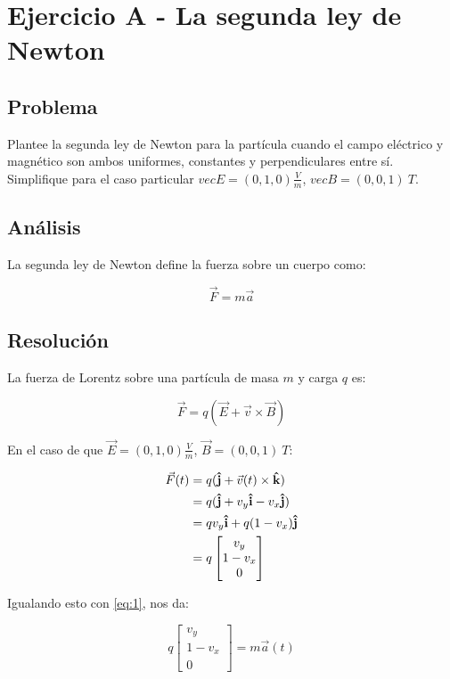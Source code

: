\section{Ejercicio A - La segunda ley de Newton}

\subsection{Problema}

Plantee la segunda ley de Newton para la partícula cuando el campo eléctrico y magnético son ambos uniformes, constantes y perpendiculares entre sí. Simplifique para el caso particular $vec{E} = (0, 1, 0) \frac{V}{m}$, $vec{B} = (0, 0, 1)\ T$.

\subsection{Análisis}

La segunda ley de Newton define la fuerza sobre un cuerpo como:

\begin{equation}\label{eq:1}
	\vec{F} = m \vec{a}
\end{equation}

\subsection{Resolución}

La fuerza de Lorentz sobre una partícula de masa $m$ y carga $q$ es:

\begin{equation}
	\vec{F} = q(\vec{E} + \vec{v} \times \vec{B})
\end{equation}

En el caso de que $\vec{E} = (0, 1, 0) \frac{V}{m}$, $\vec{B} = (0, 0, 1)\ T$:

\begin{align*}
\vec{F}(t)  
& =
	q(\boldsymbol{\hat{\textbf{j}}} + \vec{v}(t) \times \boldsymbol{\hat{\textbf{k}}}) \\
& =
	q(\boldsymbol{\hat{\textbf{j}}} + v_y \boldsymbol{\hat{\textbf{i}}} - v_x \boldsymbol{\hat{\textbf{j}}} ) \\
& = 
	qv_y \boldsymbol{\hat{\textbf{i}}} + q(1-v_x)\boldsymbol{\hat{\textbf{j}}} \\
& =
	q \begin{bmatrix}
		v_y \\
		1 - v_x \\
		0
	\end{bmatrix}
\end{align*}

Igualando esto con \eqref{eq:1}, nos da:

\begin{equation*}
	q \begin{bmatrix}
	v_y \\
	1 - v_x \\
	0
\end{bmatrix} = m \vec{a}(t)
\end{equation*}